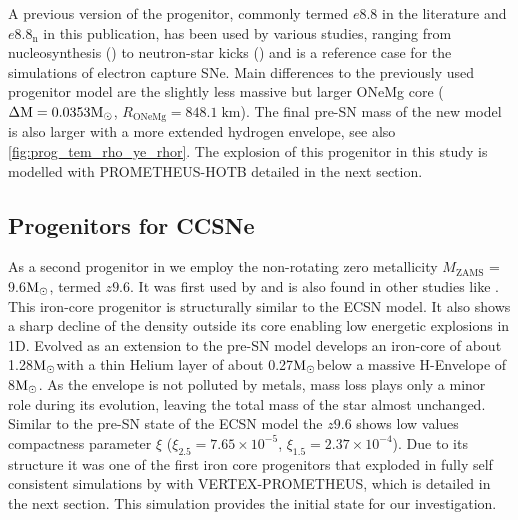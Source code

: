 \documentclass[fleqn,usenatbib]{mnras}
\newcommand{\solm}{\xspace\ensuremath{\rm{M_{\odot}}}}
\newcommand{\prom}{\textsc{P{\footnotesize ROMETHEUS}-H{\footnotesize OT}B}\xspace}
\newcommand{\vertexprom}{\textsc{V{\footnotesize ERTEX}-P{\footnotesize ROMETHEUS}}\xspace}
\begin{document}
A previous version of the progenitor, commonly termed $e8.8$ in the literature and $e8.8_{\mathrm{n}}$ in this publication, has been used by various studies, ranging from nucleosynthesis (\cite{Wanajo2018}) to neutron-star kicks (\cite{Gessner2018}) and is a reference case for the simulations of electron capture SNe. Main differences to the previously used progenitor model are the slightly less massive but larger ONeMg core ($\mathrm{\Delta M = 0.0353\solm}$, $R_{\mathrm{ONeMg}}=848.1\;\mathrm{km}$). The final pre-SN mass of the new model is also larger with a more extended hydrogen envelope, see also \autoref{fig:prog_tem_rho_ye_rhor}. The explosion of this progenitor  in this study is modelled with \prom detailed in the next section.

\subsection{Progenitors for CCSNe}
As a second progenitor in we employ the non-rotating zero metallicity $M_{\mathrm{ZAMS}}$ = 9.6\solm, termed $z9.6$. It was first used by \citet{Janka2012} and is also found in other studies like \citet{Mueller2016,Mueller2018}. This iron-core progenitor is structurally similar to the ECSN model. It also shows a sharp decline of the density outside its core enabling low energetic explosions in 1D. 
Evolved as an extension to \cite{Heger2008} the pre-SN model develops an iron-core of about 1.28\solm with a thin Helium layer of about 0.27\solm below a massive H-Envelope of 8\solm. As the envelope is not polluted by metals, mass loss plays only a minor role during its evolution, leaving the total mass of the star almost unchanged. Similar to the pre-SN state of the ECSN model the $z9.6$ shows low values compactness  parameter $\xi$ ($\xi_{2.5}= 7.65 \times 10^{-5}$, $\xi_{1.5}= 2.37 \times 10^{-4}$). 
Due to its structure it was one of the first iron core progenitors that exploded in fully self consistent simulations by \cite{Melson2015a} with \vertexprom, which is detailed in the next section. This simulation provides the initial state for our investigation. 
\end{document}
